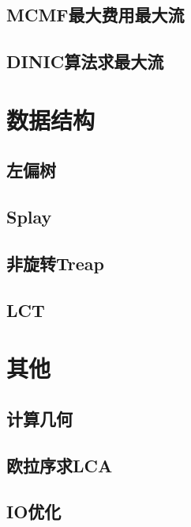 \documentclass[a4paper,12pt]{article}
\begin{document}
\subsection{MCMF最大费用最大流}

\subsection{DINIC算法求最大流}


\section{数据结构}

\subsection{左偏树}

\subsection{Splay}

\subsection{非旋转Treap}

\subsection{LCT}


\section{其他}

\subsection{计算几何}

\subsection{欧拉序求LCA}

\subsection{IO优化}



\label{LastPage}
\end{document}
